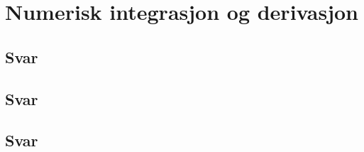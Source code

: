 \documentclass[answers,11pt]{exam}
\begin{document}
\newpage

\section*{Numerisk integrasjon og derivasjon}
\label{side:1}


\begin{enumerate}[a)]

    

  \begin{tcolorbox}
    \subsection*{Svar}
    
    
  \end{tcolorbox}




  \newpage
    

  \begin{tcolorbox}
    \subsection*{Svar}
    
    
  \end{tcolorbox}




  \newpage
    

  \begin{tcolorbox}
    \subsection*{Svar}
    
    
  \end{tcolorbox}


  
  \newpage
    


\end{enumerate}
\end{document}
